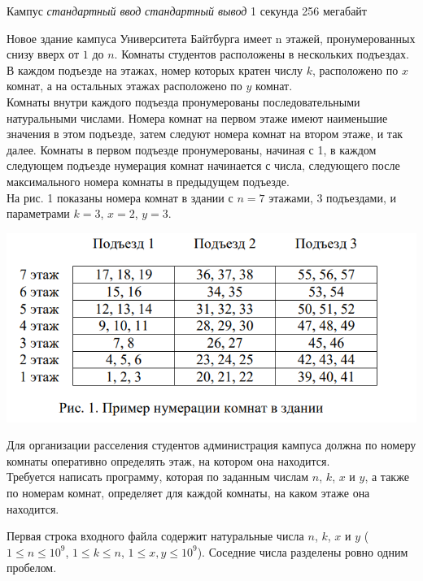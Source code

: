 \begin{problem}%
{Кампус}%
{\textsl{стандартный ввод}}%
{\textsl{стандартный вывод}}%
{1 секунда}%
{256 мегабайт}{}

Новое здание кампуса Университета Байтбурга имеет n этажей, пронумерованных снизу вверх от $1$ до $n$. Комнаты студентов расположены в нескольких подъездах.\\

В каждом подъезде на этажах, номер которых кратен числу $k$, расположено по $x$ комнат, а на остальных этажах расположено по $y$ комнат.\\

Комнаты внутри каждого подъезда пронумерованы последовательными
натуральными числами. Номера комнат на первом этаже имеют наименьшие значения в этом подъезде, затем следуют номера комнат на втором этаже, и так далее. Комнаты в первом подъезде пронумерованы, начиная с 1, в каждом следующем подъезде нумерация комнат начинается с числа, следующего после максимального номера комнаты в предыдущем
подъезде.\\

На рис. 1 показаны номера комнат в здании с $n = 7$ этажами, 3 подъездами, и
параметрами $k = 3$, $x = 2$, $y = 3$.

\begin{center}
\includegraphics[scale=0.5]{images/5.png}
\end{center}

Для организации расселения студентов администрация кампуса должна по номеру комнаты оперативно определять этаж, на котором она находится.\\

Требуется написать программу, которая по заданным числам $n$, $k$, $x$ и $y$, а также по номерам комнат, определяет для каждой комнаты, на каком этаже она находится.

\InputFile

Первая строка входного файла содержит натуральные числа $n$, $k$, $x$ и $y$ ($1 \le n \le 10^9$, $1 \le k \le n$, $1 \le x, y \le 10^9$). Соседние числа разделены ровно одним пробелом.\\


\end{problem}
